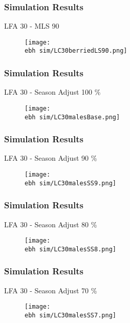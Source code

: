 \documentclass{beamer}
\newcommand{\ebh}{\string~/bio.data/bio.lobster/figures/LFA2733Framework2018/} %
\begin{document}
\begin{frame}
\frametitle{Simulation Results}
LFA 30 - MLS 90
\begin{figure}
        \begin{center}
            \texttt{[image: \\ebh sim/LC30berriedLS90.png]}
        \end{center}
    \end{figure}
\end{frame}





\begin{frame}
\frametitle{Simulation Results}
LFA 30 - Season Adjust 100 \%
\begin{figure}
        \begin{center}
            \texttt{[image: \\ebh sim/LC30malesBase.png]}
        \end{center}
    \end{figure}
\end{frame}


\begin{frame}
\frametitle{Simulation Results}
LFA 30 - Season Adjust 90 \%
\begin{figure}
        \begin{center}
            \texttt{[image: \\ebh sim/LC30malesSS9.png]}
        \end{center}
    \end{figure}
\end{frame}


\begin{frame}
\frametitle{Simulation Results}
LFA 30 - Season Adjust 80 \%
\begin{figure}
        \begin{center}
            \texttt{[image: \\ebh sim/LC30malesSS8.png]}
        \end{center}
    \end{figure}
\end{frame}


\begin{frame}
\frametitle{Simulation Results}
LFA 30 - Season Adjust 70 \%
\begin{figure}
        \begin{center}
            \texttt{[image: \\ebh sim/LC30malesSS7.png]}
        \end{center}
    \end{figure}
\end{frame}
\end{document}
